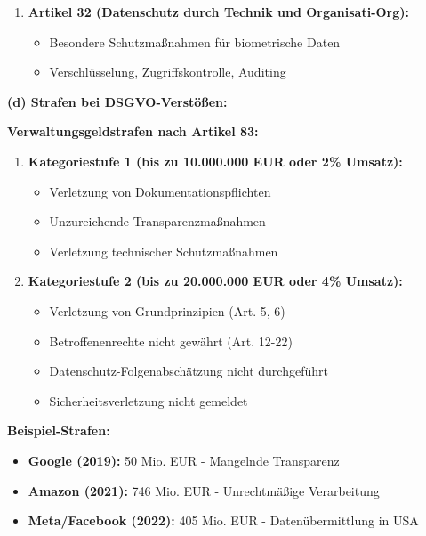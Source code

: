 \documentclass[12pt,a4paper]{article}
\begin{document}
\begin{tcolorbox}[colback=solutionbg, colframe=black!30]
\begin{enumerate}[1.]
    \item \textbf{Artikel 32 (Datenschutz durch Technik und Organisati-Org):}
    \begin{itemize}
        \item Besondere Schutzmaßnahmen für biometrische Daten
        \item Verschlüsselung, Zugriffskontrolle, Auditing
    \end{itemize}
\end{enumerate}

\end{tcolorbox}
\begin{tcolorbox}[colback=solutionbg, colframe=black!30]

\textbf{(d) Strafen bei DSGVO-Verstößen:} \checkmark

\textbf{Verwaltungsgeldstrafen nach Artikel 83:}

\begin{enumerate}[1.]
    \item \textbf{Kategoriestufe 1 (bis zu 10.000.000 EUR oder 2\% Umsatz):}
    \begin{itemize}
        \item Verletzung von Dokumentationspflichten
        \item Unzureichende Transparenzmaßnahmen
        \item Verletzung technischer Schutzmaßnahmen
    \end{itemize}
    
    \item \textbf{Kategoriestufe 2 (bis zu 20.000.000 EUR oder 4\% Umsatz):}
    \begin{itemize}
        \item Verletzung von Grundprinzipien (Art. 5, 6)
        \item Betroffenenrechte nicht gewährt (Art. 12-22)
        \item Datenschutz-Folgenabschätzung nicht durchgeführt
        \item Sicherheitsverletzung nicht gemeldet
    \end{itemize}
\end{enumerate}

\textbf{Beispiel-Strafen:}

\begin{itemize}
    \item \textbf{Google (2019):} 50 Mio. EUR - Mangelnde Transparenz
    \item \textbf{Amazon (2021):} 746 Mio. EUR - Unrechtmäßige Verarbeitung
    \item \textbf{Meta/Facebook (2022):} 405 Mio. EUR - Datenübermittlung in USA
\end{itemize}


\end{tcolorbox}
\end{document}
